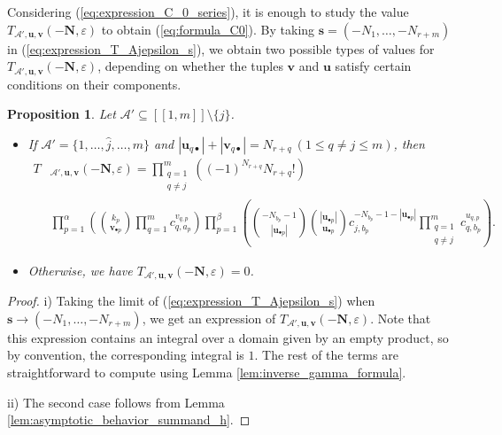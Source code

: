 \documentclass[a4paper]{amsart}
\newtheorem{proposition}[theorem]{Proposition}
\theoremstyle{remark}
\theoremstyle{definition}
\begin{document}
Considering (\ref{eq:expression_C_0_series}), it is enough to study the value $T_{\mathcal{A}',\mathbf{u},\mathbf{v}}(-\mathbf{N},\varepsilon)$ to obtain (\ref{eq:formula_C0}). By taking $\mathbf{s}=(-N_1,\ldots,-N_{r+m})$ in (\ref{eq:expression_T_Ajepsilon_s}), we obtain two possible types of values for $T_{\mathcal{A}',\mathbf{u},\mathbf{v}}(-\mathbf{N},\varepsilon)$, depending on whether the tuples $\mathbf{v}$ and $\mathbf{u}$ satisfy certain conditions on their components.

\begin{proposition}
Let $\mathcal{A}' \subseteq [\![ 1,m ]\!] \setminus \{ j \}$.
\begin{itemize}
\item[i)] If $\mathcal{A}'= \{ 1,\ldots,\widehat{j},\ldots,m \}$ and $|\mathbf{u}_{q \bullet}|+|\mathbf{v}_{q \bullet}|=N_{r+q} \ (1 \leq q \neq j \leq m)$, then
\begin{align}
    T&_{\mathcal{A}',\mathbf{u},\mathbf{v}}(-\mathbf{N},\varepsilon) = \prod_{\substack{q=1 \\ q \neq j}}^m \left( (-1)^{N_{r+q}}N_{r+q}!\right) \label{eq:value_T_Ajepsilon_1st_case} \\
    & \prod_{p=1}^{\alpha} \left( \binom{k_p}{\mathbf{v}_{\bullet p}} \prod_{q=1}^{m} c_{q,a_p}^{v_{q,p}} \right) \prod_{p=1}^{\beta} \left( \binom{-N_{b_p}-1}{|\mathbf{u}_{\bullet p}|} \binom{|\mathbf{u}_{\bullet p}|}{\mathbf{u}_{\bullet p}} c_{j,b_p}^{-N_{b_p}-1-|\mathbf{u}_{\bullet p}|} \prod_{\substack{q=1 \\ q \neq j}}^{m} c_{q,b_p}^{u_{q,p}} \right). \nonumber
\end{align}

\item[ii)] Otherwise, we have $T_{\mathcal{A}',\mathbf{u},\mathbf{v}}(-\mathbf{N},\varepsilon) = 0$.
\end{itemize}
\end{proposition}

\begin{proof}
i) Taking the limit of (\ref{eq:expression_T_Ajepsilon_s}) when $\mathbf{s} \to (-N_1,\ldots,-N_{r+m})$, we get an expression of $T_{\mathcal{A}',\mathbf{u},\mathbf{v}}(-\mathbf{N},\varepsilon)$. Note that this expression contains an integral over a domain given by an empty product, so by convention, the corresponding integral is $1$. The rest of the terms are straightforward to compute using Lemma \ref{lem:inverse_gamma_formula}.

ii) The second case follows from Lemma \ref{lem:asymptotic_behavior_summand_h}.
\end{proof}
\end{document}
